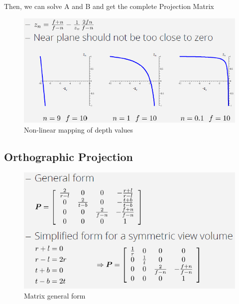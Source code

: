 \documentclass{article}
\begin{document}
Then, we can solve A and B and get the complete Projection Matrix
\begin{figure}
\includegraphics[scale=0.6]{image44.png}
\caption{Non-linear mapping of depth values}
\end{figure}

\subsection{Orthographic Projection}
\begin{figure}
\includegraphics[scale=0.6]{image46.png}
\caption{Matrix general form}
\end{figure}
\end{document}
